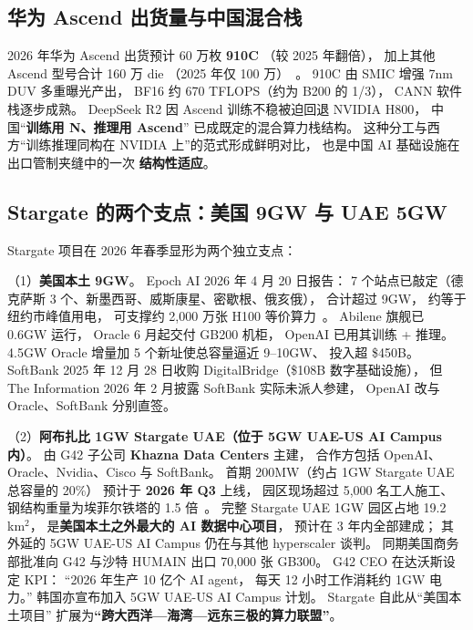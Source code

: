 \subsection{华为 Ascend 出货量与中国混合栈}

2026 年华为 Ascend 出货预计 60 万枚 \textbf{910C}
（较 2025 年翻倍），
加上其他 Ascend 型号合计 160 万 die
（2025 年仅 100 万）~\cite{huawei_ascend_910c_volume_2026}。
910C 由 SMIC 增强 7nm DUV 多重曝光产出，
BF16 约 670 TFLOPS（约为 B200 的 1/3），
CANN 软件栈逐步成熟。
DeepSeek R2 因 Ascend 训练不稳被迫回退 NVIDIA H800，
中国“\textbf{训练用 N、推理用 Ascend}”
已成既定的混合算力栈结构。
这种分工与西方“训练推理同构在 NVIDIA 上”的范式形成鲜明对比，
也是中国 AI 基础设施在出口管制夹缝中的一次
\textbf{结构性适应}。

\subsection{Stargate 的两个支点：美国 9GW 与 UAE 5GW}

Stargate 项目在 2026 年春季显形为两个独立支点：

（1）\textbf{美国本土 9GW}。
Epoch AI 2026 年 4 月 20 日报告：
7 个站点已敲定（德克萨斯 3 个、新墨西哥、威斯康星、密歇根、俄亥俄），
合计超过 9GW，
约等于纽约市峰值用电，
可支撑约 2,000 万张 H100 等价算力~\cite{stargate_9gw_2026}。
Abilene 旗舰已 0.6GW 运行，
Oracle 6 月起交付 GB200 机柜，
OpenAI 已用其训练 + 推理。
4.5GW Oracle 增量加 5 个新址使总容量逼近 9--10GW、
投入超 \$450B。
SoftBank 2025 年 12 月 28 日收购 DigitalBridge（\$108B 数字基础设施），
但 The Information 2026 年 2 月披露 SoftBank 实际未派人参建，
OpenAI 改与 Oracle、SoftBank 分别直签。

（2）\textbf{阿布扎比 1GW Stargate UAE（位于 5GW UAE-US AI Campus 内）}。
由 G42 子公司 \textbf{Khazna Data Centers} 主建，
合作方包括 OpenAI、Oracle、Nvidia、Cisco 与 SoftBank。
首期 200MW（约占 1GW Stargate UAE 总容量的 20\%）
预计于 \textbf{2026 年 Q3} 上线，
园区现场超过 5,000 名工人施工、
钢结构重量为埃菲尔铁塔的 1.5 倍~\cite{stargate_uae_5gw_2026}。
完整 Stargate UAE 1GW 园区占地 19.2 km$^2$，
是\textbf{美国本土之外最大的 AI 数据中心项目}，
预计在 3 年内全部建成；
其外延的 5GW UAE-US AI Campus 仍在与其他 hyperscaler 谈判。
同期美国商务部批准向 G42 与沙特 HUMAIN 出口 70,000 张 GB300。
G42 CEO 在达沃斯设定 KPI：
“2026 年生产 10 亿个 AI agent，
每天 12 小时工作消耗约 1GW 电力。”
韩国亦宣布加入 5GW UAE-US AI Campus 计划。
Stargate 自此从“美国本土项目”
扩展为\textbf{“跨大西洋—海湾—远东三极的算力联盟”}。

